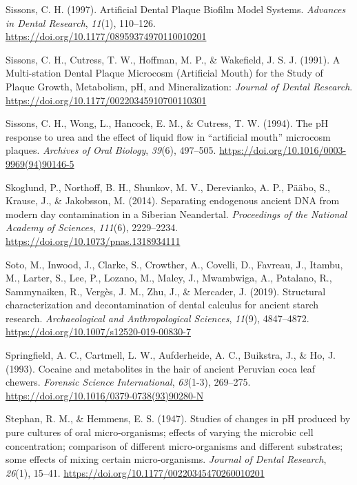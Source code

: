 \documentclass[
  letterpaper,
]{book}
\newlength{\cslhangindent}
\newlength{\cslentryspacingunit} %
\newenvironment{CSLReferences}[2] %
 {%
  \setlength{\parindent}{0pt}
  \ifodd #1
  \let\oldpar\par
  \def\par{\hangindent=\cslhangindent\oldpar}
  \fi
  \setlength{\parskip}{#2\cslentryspacingunit}
 }%
 {}
\begin{document}
\begin{CSLReferences}{1}{0}
\leavevmode{}%
Sissons, C. H. (1997). Artificial {Dental Plaque Biofilm Model Systems}.
\emph{Advances in Dental Research}, \emph{11}(1), 110--126.
\url{https://doi.org/10.1177/08959374970110010201}

\leavevmode{}%
Sissons, C. H., Cutress, T. W., Hoffman, M. P., \& Wakefield, J. S. J.
(1991). A {Multi-station Dental Plaque Microcosm} ({Artificial Mouth})
for the {Study} of {Plaque Growth}, {Metabolism}, {pH}, and
{Mineralization}: \emph{Journal of Dental Research}.
\url{https://doi.org/10.1177/00220345910700110301}

\leavevmode{}%
Sissons, C. H., Wong, L., Hancock, E. M., \& Cutress, T. W. (1994). The
{pH} response to urea and the effect of liquid flow in {``artificial
mouth''} microcosm plaques. \emph{Archives of Oral Biology},
\emph{39}(6), 497--505.
\url{https://doi.org/10.1016/0003-9969(94)90146-5}

\leavevmode{}%
Skoglund, P., Northoff, B. H., Shunkov, M. V., Derevianko, A. P., Pääbo,
S., Krause, J., \& Jakobsson, M. (2014). Separating endogenous ancient
{DNA} from modern day contamination in a {Siberian Neandertal}.
\emph{Proceedings of the National Academy of Sciences}, \emph{111}(6),
2229--2234. \url{https://doi.org/10.1073/pnas.1318934111}

\leavevmode{}%
Soto, M., Inwood, J., Clarke, S., Crowther, A., Covelli, D., Favreau,
J., Itambu, M., Larter, S., Lee, P., Lozano, M., Maley, J., Mwambwiga,
A., Patalano, R., Sammynaiken, R., Vergès, J. M., Zhu, J., \& Mercader,
J. (2019). Structural characterization and decontamination of dental
calculus for ancient starch research. \emph{Archaeological and
Anthropological Sciences}, \emph{11}(9), 4847--4872.
\url{https://doi.org/10.1007/s12520-019-00830-7}

\leavevmode{}%
Springfield, A. C., Cartmell, L. W., Aufderheide, A. C., Buikstra, J.,
\& Ho, J. (1993). Cocaine and metabolites in the hair of ancient
{Peruvian} coca leaf chewers. \emph{Forensic Science International},
\emph{63}(1-3), 269--275.
\url{https://doi.org/10.1016/0379-0738(93)90280-N}

\leavevmode{}%
Stephan, R. M., \& Hemmens, E. S. (1947). Studies of changes in {pH}
produced by pure cultures of oral micro-organisms; effects of varying
the microbic cell concentration; comparison of different micro-organisms
and different substrates; some effects of mixing certain
micro-organisms. \emph{Journal of Dental Research}, \emph{26}(1),
15--41. \url{https://doi.org/10.1177/00220345470260010201}


\end{CSLReferences}
\end{document}
